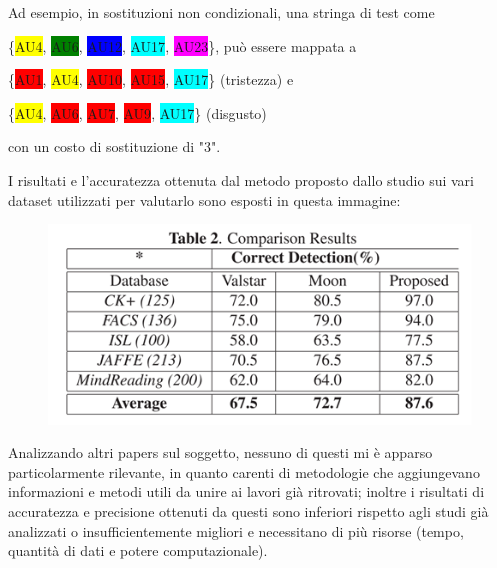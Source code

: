 Ad esempio, in sostituzioni non condizionali, una stringa di test come 

\{{\colorbox{yellow}{AU4}, \colorbox{green}{AU6}, \colorbox{blue}{AU12}, \colorbox{cyan}{AU17}, \colorbox{magenta}{AU23}\}}, può essere mappata a 

\{{\colorbox{red}{AU1}, \colorbox{yellow}{AU4}, \colorbox{red}{AU10}, \colorbox{red}{AU15}, \colorbox{cyan}{AU17}\}} (tristezza) e 

\{{\colorbox{yellow}{AU4}, \colorbox{red}{AU6}, \colorbox{red}{AU7}, \colorbox{red}{AU9}, \colorbox{cyan}{AU17}\}} (disgusto) 

con un costo di sostituzione di "3". 

I risultati e l’accuratezza ottenuta dal metodo proposto dallo studio sui vari dataset utilizzati per valutarlo sono esposti in questa immagine:

\begin{figure}
    \begin{center}    
        \includegraphics[width=1\linewidth]{images/22.png}
    \end{center}
\end{figure}

\newpage

Analizzando altri papers sul soggetto, nessuno di questi mi è apparso particolarmente rilevante, in quanto carenti di metodologie che aggiungevano informazioni e metodi utili da unire ai lavori già ritrovati; inoltre i risultati di accuratezza e precisione ottenuti da questi sono inferiori rispetto agli studi già analizzati o insufficientemente migliori e necessitano di più risorse (tempo, quantità di dati e potere computazionale).

